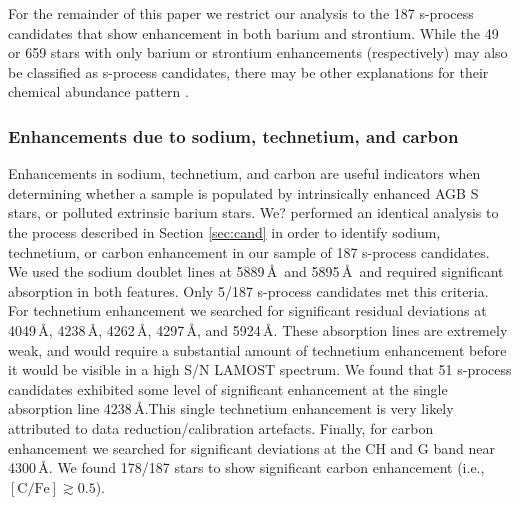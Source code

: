 \documentclass[a4paper,fleqn,usenatbib]{mnras}
\begin{document}
For the remainder of this paper we restrict our analysis to the 187 s-process candidates that show enhancement in both barium and strontium. While the 49 or 659 stars with only barium or strontium enhancements (respectively) may also be classified as s-process candidates, there may be other explanations for their chemical abundance pattern \citep[e.g.,][]{maiorca2011}. 


\subsubsection{Enhancements due to sodium, technetium, and carbon} \label{sec:other enhancements}
Enhancements in sodium, technetium, and carbon are useful indicators when determining whether a sample is populated by intrinsically enhanced AGB S stars, or polluted extrinsic barium stars. We? performed an identical analysis to the process described in Section \ref{sec:cand} in order to identify sodium, technetium, or carbon enhancement in our sample of 187 s-process candidates. We used the sodium doublet lines at 5889\,\AA\ and 5895\,\AA\, and required significant absorption in both features. Only 5/187 s-process candidates met this criteria. For technetium enhancement we searched for significant residual deviations at 4049\,\AA, 4238\,\AA, 4262\,\AA, 4297\,\AA, and 5924\,\AA. These absorption lines are extremely weak, and would require a substantial amount of technetium enhancement before it would be visible in a high S/N LAMOST spectrum. We found that 51 s-process candidates exhibited some level of significant enhancement at the single absorption line 4238\,\AA.This single technetium enhancement is very likely attributed to data reduction/calibration artefacts. Finally, for carbon enhancement we searched for significant deviations at the CH and G band near 4300\,\AA. We found 178/187 stars to show significant carbon enhancement (i.e., $[\textrm{C/Fe}] \gtrsim 0.5$). 
\end{document}
